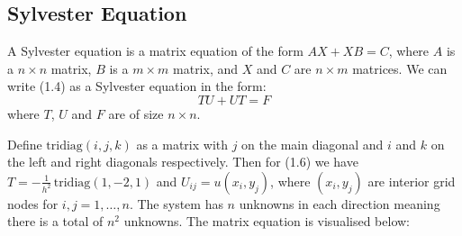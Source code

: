 \documentclass{article}
\numberwithin{equation}{section}
\begin{document}
\subsection{Sylvester Equation}
A Sylvester equation is a matrix equation of the form $AX + XB = C$, where $A$ is a $n \times n$ matrix, $B$ is a $m \times m$ matrix, and $X$ and $C$ are $n \times m$ matrices. We can write (1.4) as a Sylvester equation in the form:
	\begin{equation}
	TU + UT = F
	\end{equation}
where $T$, $U$ and $F$ are of size $n \times n$.

Define $\text{tridiag}(i,j,k)$ as a matrix with $j$ on the main diagonal and $i$ and $k$ on the left and right diagonals respectively. Then for (1.6) we have $T=-\frac{1}{h^2} \, \text{tridiag}(1,-2,1)$ and $U_{ij} = u(x_i, y_j)$, where $(x_i, y_j)$ are interior grid nodes for $i,j=1,\dots,n$. The system has $n$ unknowns in each direction meaning there is a total of $n^2$ unknowns. The matrix equation is visualised below:
\end{document}
